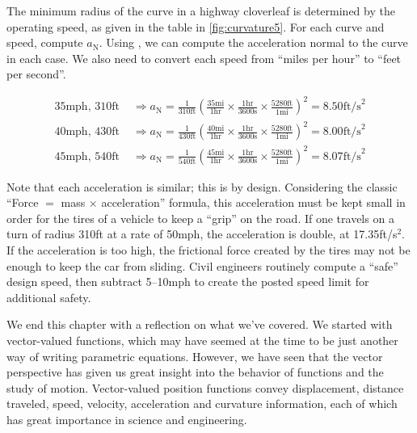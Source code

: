 \begin{example}\label{ex_curvature5}
The minimum radius of the curve in a highway cloverleaf is determined by the operating speed, as given in the table in \autoref{fig:curvature5}. For each curve and speed, compute $a_{\mathrm{N}}$.
\solution
{}
Using , we can compute the acceleration normal to the curve in each case. We also need to convert each speed from ``miles per hour'' to ``feet per second''.

\begin{align*}
 \text{35mph, 310ft }
 &\Rightarrow a_{\mathrm{N}}
 =\frac1{310\text{ft}}\left(\frac{35\text{mi}}{1\text{hr}}\times\frac{1\text{hr}}{3600\text{s}}\times\frac{5280\text{ft}}{1\text{mi}}\right)^2
 =8.50\text{ft/s}^2\\
 \text{40mph, 430ft }
 &\Rightarrow a_{\mathrm{N}}
 =\frac1{430\text{ft}}\left(\frac{40\text{mi}}{1\text{hr}}\times\frac{1\text{hr}}{3600\text{s}}\times\frac{5280\text{ft}}{1\text{mi}}\right)^2
 =8.00\text{ft/s}^2\\
 \text{45mph, 540ft }
 &\Rightarrow a_{\mathrm{N}}
 =\frac1{540\text{ft}}\left(\frac{45\text{mi}}{1\text{hr}}\times\frac{1\text{hr}}{3600\text{s}}\times\frac{5280\text{ft}}{1\text{mi}}\right)^2
 =8.07\text{ft/s}^2
\end{align*}

Note that each acceleration is similar; this is by design. Considering the classic ``Force $=$ mass $\times$ acceleration'' formula, this acceleration must be kept small in order for the tires of a vehicle to keep a ``grip'' on the road. If one travels on a turn of radius 310ft at a rate of 50mph, the acceleration is double, at 17.35ft/s$^2$. If the acceleration is too high, the frictional force created by the tires may not be enough to keep the car from sliding. Civil engineers routinely compute a ``safe'' design speed, then subtract 5--10mph to create the posted speed limit for additional safety.
\end{example}


We end this chapter with a reflection on what we've covered. We started with vector-valued functions, which may have seemed at the time to be just another way of writing parametric equations. However, we have seen that the vector perspective has given us great insight into the behavior of functions and the study of motion. Vector-valued position functions convey displacement, distance traveled, speed, velocity, acceleration and curvature information, each of which has great importance in science and engineering.

